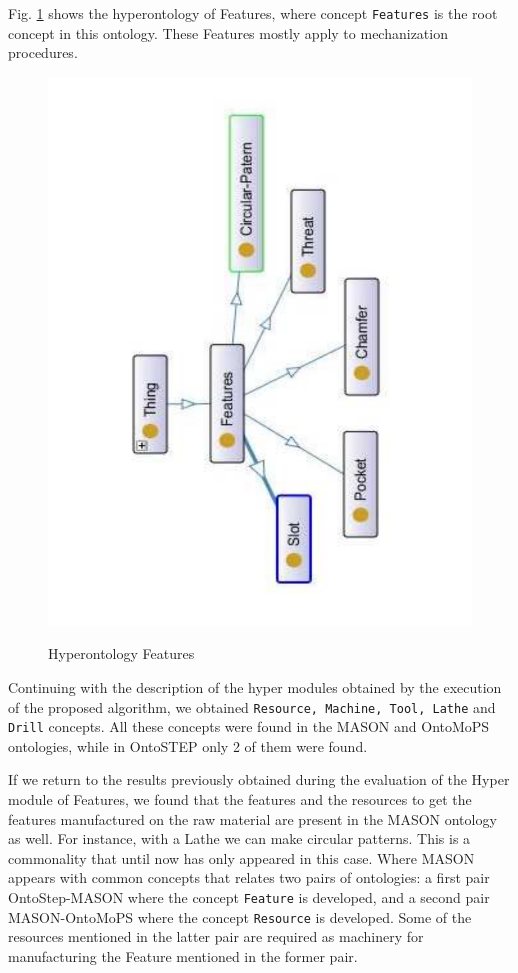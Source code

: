 Fig. \ref{figure4-23} shows the hyperontology of Features, where concept \texttt{Features} is the  root concept in this ontology. These Features mostly apply to mechanization procedures. 


\begin{figure}
\begin{center}
	\includegraphics[scale=0.5, angle=270]{figure-chapterIV/fig4-23}\\
	\vspace{-40}
	\caption{Hyperontology Features}
	\label{figure4-23}
\end{center}
\end{figure}

Continuing with the description of the hyper modules obtained by the execution of the proposed algorithm, we obtained \texttt{Resource, Machine, Tool, Lathe} and \texttt{Drill} concepts. All these concepts were  found in the MASON and OntoMoPS ontologies, while in OntoSTEP only 2 of them were found. 

If we return to the results previously obtained during the evaluation of the Hyper module of Features, we found that the features and the resources to \cbstart get the features manufactured on the raw material \cbend are present in the MASON ontology as well. For instance, with a Lathe we can make circular patterns. This is a commonality that until now has only appeared in this case. Where MASON appears with common concepts that relates two pairs of ontologies: a first pair OntoStep-MASON where the concept \texttt{Feature} is developed, and a second pair MASON-OntoMoPS where the concept \texttt{Resource} is developed. Some of the resources mentioned in the latter pair are required as machinery for manufacturing the Feature mentioned in the former pair. 

